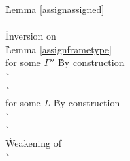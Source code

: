 \begin{description}
\begin{tabbing}
    \` Lemma \ref{assignassigned} \\
   \\
    \` Inversion on  \\
    \` Lemma \ref{assignframetype} \\
   for some $\Gamma''$
    \` By construction \\
    \`  \\
    \`  \\
   for some $L$
    \` By construction \\
    \`  \\
    \`  \\
    \` Weakening of  \\

    \`  \\
  \end{tabbing}


\end{description}
